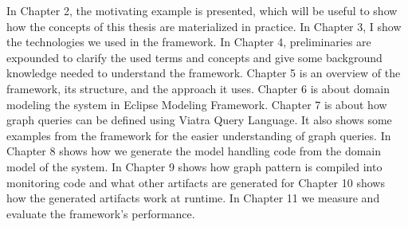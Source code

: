 	


In Chapter 2, the motivating example is presented, which will be useful to show how the concepts of this thesis are materialized in practice.
In Chapter 3, I show the technologies we used in the framework.
In Chapter 4, preliminaries are expounded to clarify the used terms and concepts and give some background knowledge needed to understand the framework.
Chapter 5 is an overview of the framework, its structure, and the approach it uses.
Chapter 6 is about domain modeling the system in Eclipse Modeling Framework.
Chapter 7 is about how graph queries can be defined using Viatra Query Language. It also shows some examples from the framework for the easier understanding of graph queries.
In Chapter 8 shows how we generate the model handling code from the domain model of the system.
In Chapter 9 shows how graph pattern is compiled into monitoring code and what other artifacts are generated for 
Chapter 10 shows how the generated artifacts work at runtime. 
In Chapter 11 we measure and evaluate the framework's performance.


